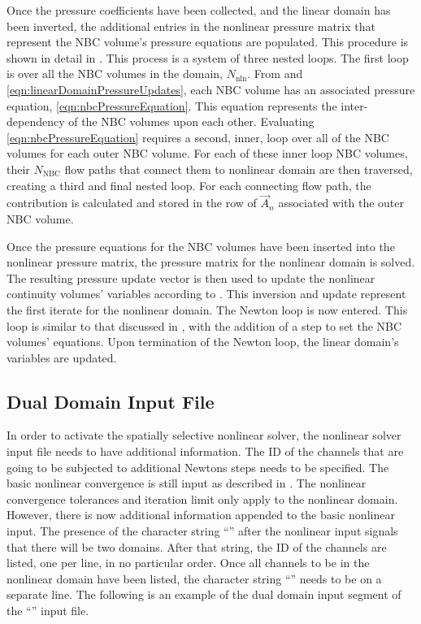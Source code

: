 Once the pressure coefficients have been collected, and the linear domain has been inverted, the additional entries in the nonlinear pressure matrix that represent the NBC volume's pressure equations are populated.
This procedure is shown in detail in .
This process is a system of three nested loops.
The first loop is over all the NBC volumes in the domain, $N_{\text{nln}}$.
From  and \eqref{eqn:linearDomainPressureUpdates}, each NBC volume has an associated pressure equation, \eqref{eqn:nbcPressureEquation}.
This equation represents the inter-dependency of the NBC volumes upon each other.
Evaluating \eqref{eqn:nbcPressureEquation} requires a second, inner, loop over all of the NBC volumes for each outer NBC volume.
For each of these inner loop NBC volumes, their $N_{\text{NBC}}$ flow paths that connect them to nonlinear domain are then traversed, creating a third and final nested loop.
For each connecting flow path, the contribution is calculated and stored in the row of $\vec{A}_{n}$ associated with the outer NBC volume.

Once the pressure equations for the NBC volumes have been inserted into the nonlinear pressure matrix, the pressure matrix for the nonlinear domain is solved.
The resulting pressure update vector is then used to update the nonlinear continuity volumes' variables according to .
This inversion and update represent the first iterate for the nonlinear domain.
The Newton loop is now entered.
This loop is similar to that discussed in , with the addition of a step to set the NBC volumes' equations.
Upon termination of the Newton loop, the linear domain's variables are updated.

\subsection{Dual Domain Input File}
\label{subsect:domDecompInputFile}

In order to activate the spatially selective nonlinear solver, the nonlinear solver input file needs to have additional information.
The ID of the channels that are going to be subjected to additional Newtons steps needs to be specified.
The basic nonlinear convergence is still input as described in .
The nonlinear convergence tolerances and iteration limit only apply to the nonlinear domain.
However, there is now additional information appended to the basic nonlinear input.
The presence of the character string ``'' after the nonlinear input signals that there will be two domains.
After that string, the ID of the channels are listed, one per line, in no particular order.
Once all channels to be in the nonlinear domain have been listed, the character string ``'' needs to be on a separate line.
The following is an example of the dual domain input segment of the ``'' input file.

